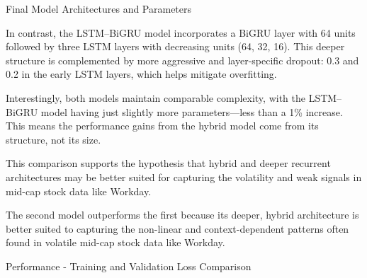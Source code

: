 \begin{frame}[label=final_models]{Final Model Architectures and Parameters}
{In contrast, the LSTM–BiGRU model incorporates a BiGRU layer with 64 units followed by three LSTM layers with decreasing units (64, 32, 16). This deeper structure is complemented by more aggressive and layer-specific dropout: 0.3 and 0.2 in the early LSTM layers, which helps mitigate overfitting.

Interestingly, both models maintain comparable complexity, with the LSTM–BiGRU model having just slightly more parameters—less than a 1\% increase. This means the performance gains from the hybrid model come from its structure, not its size.

This comparison supports the hypothesis that hybrid and deeper recurrent architectures may be better suited for capturing the volatility and weak signals in mid-cap stock data like Workday.

The second model outperforms the first because its deeper, hybrid architecture is better suited to capturing the non-linear and context-dependent patterns often found in volatile mid-cap stock data like Workday.
}
\end{frame}

\begin{frame}[shrink]{Performance - Training and Validation Loss Comparison}
\centering
{}
\end{frame}

